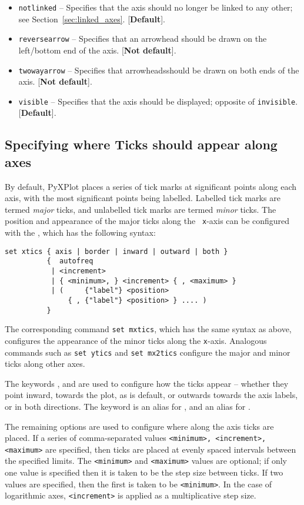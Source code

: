 \begin{itemize}
\item {\tt notlinked} -- Specifies that the axis should no longer be linked to any other; see Section~\ref{sec:linked_axes}. [{\bf Default}].
\item {\tt reversearrow} -- Specifies that an arrowhead should be drawn on the left/bottom end of the axis. [{\bf Not default}].
\item {\tt twowayarrow} -- Specifies that arrowheadsshould be drawn on both ends of the axis. [{\bf Not default}].
\item {\tt visible} -- Specifies that the axis should be displayed; opposite of {\tt invisible}. [{\bf Default}].
\end{itemize}

\subsection{Specifying where Ticks should appear along axes}

By default, PyXPlot places a series of tick marks at significant points along
each axis, with the most significant points being labelled.  Labelled tick
marks are termed {\it major} ticks, and unlabelled tick marks are termed {\it
minor} ticks.  The position and appearance of the major ticks along the {\tt
x}-axis can be configured with the , which has the following
syntax:

\begin{verbatim}
set xtics { axis | border | inward | outward | both }
          {  autofreq
           | <increment>
           | { <minimum>, } <increment> { , <maximum> }
           | (     {"label"} <position>
               { , {"label"} <position> } .... )
          }
\end{verbatim}

The corresponding command {\tt set mxtics}, which has the same syntax as above,
configures the appearance of the minor ticks along the {\tt x}-axis. Analogous
commands such as {\tt set ytics} and {\tt set mx2tics} configure the major and
minor ticks along other axes.

The keywords ,  and  are used to
configure how the ticks appear -- whether they point inward, towards the plot,
as is default, or outwards towards the axis labels, or in both directions.  The
keyword  is an alias for , and 
an alias for .

The remaining options are used to configure where along the axis ticks are
placed. If a series of comma-separated values {\tt <minimum>, <increment>,
<maximum>} are specified, then ticks are placed at evenly spaced intervals
between the specified limits. The {\tt <minimum>} and {\tt <maximum>} values
are optional; if only one value is specified then it is taken to be the step
size between ticks. If two values are specified, then the first is taken to be
{\tt <minimum>}. In the case of logarithmic axes, {\tt <increment>} is applied
as a multiplicative step size.

